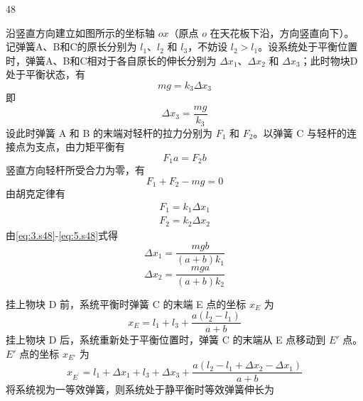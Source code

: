 \begin{solution}{48}
\begin{subsolution}
沿竖直方向建立如图所示的坐标轴 $ox$（原点 $o$ 在天花板下沿，方向竖直向下）。记弹簧A、B和C的原长分别为 $l_{1}$、$l_{2}$ 和 $l_{3}$，不妨设 $l_{2} > l_{1}$。设系统处于平衡位置时，弹簧A、B和C相对于各自原长的伸长分别为 $\Delta x_{1}$、$\Delta x_{2}$ 和 $\Delta x_{3}$；此时物块D处于平衡状态，有
\begin{equation}
mg = k_{3}\Delta x_{3}
\label{eq:1.s48}
\end{equation}
即
\begin{equation}
\Delta x_{3} = \frac{mg}{k_{3}}
\label{eq:2.s48}
\end{equation}
设此时弹簧 A 和 B 的末端对轻杆的拉力分别为 $F_{1}$ 和 $F_{2}$。以弹簧 C 与轻杆的连接点为支点，由力矩平衡有
\begin{equation}
F_{1}a = F_{2}b
\label{eq:3.s48}
\end{equation}
竖直方向轻杆所受合力为零，有
\begin{equation}
F_{1} + F_{2} - mg = 0
\label{eq:4.s48}
\end{equation}
由胡克定律有
\begin{equation}
\begin{array}{l}
F_{1} = k_{1}\Delta x_{1} \\
F_{2} = k_{2}\Delta x_{2}
\end{array}
\label{eq:5.s48}
\end{equation}
由\eqref{eq:3.s48}-\eqref{eq:5.s48}式得
\begin{equation}
\Delta x_{1} = \frac{mgb}{(a+b)k_{1}}
\label{eq:6.s48}
\end{equation}
\begin{equation}
\Delta x_{2} = \frac{mga}{(a+b)k_{2}}
\label{eq:7.s48}
\end{equation}
\end{subsolution}
\begin{subsolution}
挂上物块 D 前，系统平衡时弹簧 C 的末端 E 点的坐标 $x_{E}$ 为
\begin{equation}
x_{E} = l_{1} + l_{3} + \frac{a(l_{2} - l_{1})}{a+b}
\label{eq:8.s48}
\end{equation}
挂上物块 D 后，系统重新处于平衡位置时，弹簧 C 的末端从 E 点移动到 $E'$ 点。$E'$ 点的坐标 $x_{E'}$ 为
\begin{equation}
x_{E^{\prime}} = l_{1} + \Delta x_{1} + l_{3} + \Delta x_{3} + \frac{a(l_{2} - l_{1} + \Delta x_{2} - \Delta x_{1})}{a+b}
\label{eq:9.s48}
\end{equation}
将系统视为一等效弹簧，则系统处于静平衡时等效弹簧伸长为

\end{subsolution}
\end{solution}

